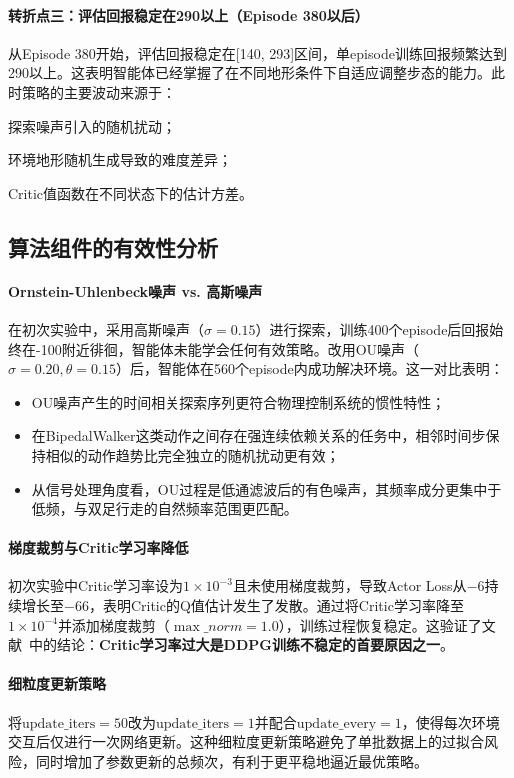 \documentclass[UTF8,a4paper,12pt]{ctexart}
\begin{document}
\paragraph{转折点三：评估回报稳定在290以上（Episode 380以后）}
从Episode 380开始，评估回报稳定在[140, 293]区间，单episode训练回报频繁达到290以上。这表明智能体已经掌握了在不同地形条件下自适应调整步态的能力。此时策略的主要波动来源于：\begin{inparaenum}
  \item 探索噪声引入的随机扰动；
  \item 环境地形随机生成导致的难度差异；
  \item Critic值函数在不同状态下的估计方差。
\end{inparaenum}

\subsection{算法组件的有效性分析}

\paragraph{Ornstein-Uhlenbeck噪声 vs. 高斯噪声}
在初次实验中，采用高斯噪声（$\sigma=0.15$）进行探索，训练400个episode后回报始终在-100附近徘徊，智能体未能学会任何有效策略。改用OU噪声（$\sigma=0.20, \theta=0.15$）后，智能体在560个episode内成功解决环境。这一对比表明：
\begin{itemize}[leftmargin=2em]
  \item OU噪声产生的时间相关探索序列更符合物理控制系统的惯性特性；
  \item 在BipedalWalker这类动作之间存在强连续依赖关系的任务中，相邻时间步保持相似的动作趋势比完全独立的随机扰动更有效；
  \item 从信号处理角度看，OU过程是低通滤波后的有色噪声，其频率成分更集中于低频，与双足行走的自然频率范围更匹配。
\end{itemize}

\paragraph{梯度裁剪与Critic学习率降低}
初次实验中Critic学习率设为$1\times10^{-3}$且未使用梯度裁剪，导致Actor Loss从$-6$持续增长至$-66$，表明Critic的Q值估计发生了发散。通过将Critic学习率降至$1\times10^{-4}$并添加梯度裁剪（$\max\_norm=1.0$），训练过程恢复稳定。这验证了文献~\cite{fujimoto2018td3}中的结论：\textbf{Critic学习率过大是DDPG训练不稳定的首要原因之一}。

\paragraph{细粒度更新策略}
将$\text{update\_iters}=50$改为$\text{update\_iters}=1$并配合$\text{update\_every}=1$，使得每次环境交互后仅进行一次网络更新。这种细粒度更新策略避免了单批数据上的过拟合风险，同时增加了参数更新的总频次，有利于更平稳地逼近最优策略。
\end{document}
